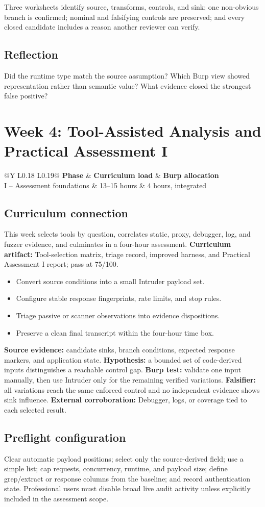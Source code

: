 \documentclass[11pt]{article}
\makeatletter
\newcommand{\weekheader}[5]{%
  \clearpage
  \section{Week #1: #2}
  \begin{tcolorbox}[colback=Navy,colframe=Navy,coltext=white]
    \begin{tabularx}{\linewidth}{@{}Y L{0.18\linewidth} L{0.19\linewidth}@{}}
      \textbf{Phase} & \textbf{Curriculum load} & \textbf{Burp allocation}\\
      #3 & #4 hours & #5 hours, integrated
    \end{tabularx}
  \end{tcolorbox}
}
\newcommand{\weekfield}[2]{%
  \Needspace{5\baselineskip}
  \subsection*{#1}
  #2
}
\newcommand{\curriculumartifact}[1]{\textbf{Curriculum artifact:} #1}
\newcommand{\externalproof}[1]{\textbf{External corroboration:} #1}
\makeatother
\begin{document}
\begin{checkpoints}
Three worksheets identify source, transforms, controls, and sink; one non-obvious
branch is confirmed; nominal and falsifying controls are preserved; and every
closed candidate includes a reason another reviewer can verify.
\end{checkpoints}

\weekfield{Reflection}{Did the runtime type match the source assumption? Which
Burp view showed representation rather than semantic value? What evidence closed
the strongest false positive?}

\weekheader{4}{Tool-Assisted Analysis and Practical Assessment I}{I -- Assessment foundations}{13--15}{4}

\weekfield{Curriculum connection}{This week selects tools by question, correlates
static, proxy, debugger, log, and fuzzer evidence, and culminates in a four-hour
assessment. \curriculumartifact{Tool-selection matrix, triage record, improved
harness, and Practical Assessment I report; pass at 75/100.}}

\begin{objectivebox}
\begin{itemize}
  \item Convert source conditions into a small Intruder payload set.
  \item Configure stable response fingerprints, rate limits, and stop rules.
  \item Triage passive or scanner observations into evidence dispositions.
  \item Preserve a clean final transcript within the four-hour time box.
\end{itemize}
\end{objectivebox}

\begin{bridgebox}
\textbf{Source evidence:} candidate sinks, branch conditions, expected response
markers, and application state. \textbf{Hypothesis:} a bounded set of code-derived
inputs distinguishes a reachable control gap. \textbf{Burp test:} validate one
input manually, then use Intruder only for the remaining verified variations.
\textbf{Falsifier:} all variations reach the same enforced control and no
independent evidence shows sink influence. \externalproof{Debugger, logs, or
coverage tied to each selected result.}
\end{bridgebox}

\weekfield{Preflight configuration}{Clear automatic payload positions; select
only the source-derived field; use a simple list; cap requests, concurrency,
runtime, and payload size; define grep/extract or response columns from the
baseline; and record authentication state. Professional users must disable broad
live audit activity unless explicitly included in the assessment scope.}
\end{document}
